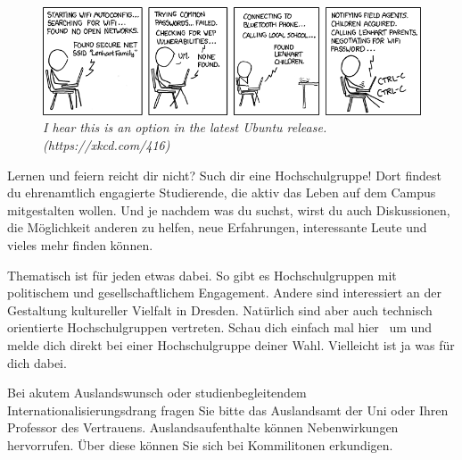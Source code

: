 \begin{figure}[b]
	\centering
	\includegraphics[width=\textwidth, keepaspectratio]{img/xkcd/zealous_autoconfig.png}
	\caption*{{\small \textit{I hear this is an option in the latest Ubuntu release. (https://xkcd.com/416)}}}
\end{figure}

\label{sec:hsg}

Lernen und feiern reicht dir nicht?
Such dir eine Hochschulgruppe!
Dort findest du ehrenamtlich engagierte Studierende, die aktiv das Leben auf
dem Campus mitgestalten wollen.
Und je nachdem was du suchst, wirst du auch Diskussionen, die Möglichkeit anderen zu helfen, neue Erfahrungen, interessante Leute und vieles mehr finden können.

Thematisch ist für jeden etwas dabei.
So gibt es Hochschulgruppen mit politischem und gesellschaftlichem Engagement.
Andere sind interessiert an der Gestaltung kultureller Vielfalt in Dresden.
Natürlich sind aber auch technisch orientierte Hochschulgruppen vertreten.
Schau dich einfach mal hier~ um und melde dich direkt bei einer Hochschulgruppe deiner Wahl.
Vielleicht ist ja was für dich dabei.


Bei akutem Auslandswunsch oder studienbegleitendem Internationalisierungsdrang fragen Sie bitte das Auslandsamt der Uni oder Ihren Professor des Vertrauens.
Auslandsaufenthalte können Nebenwirkungen hervorrufen.
Über diese können Sie sich bei Kommilitonen erkundigen.

